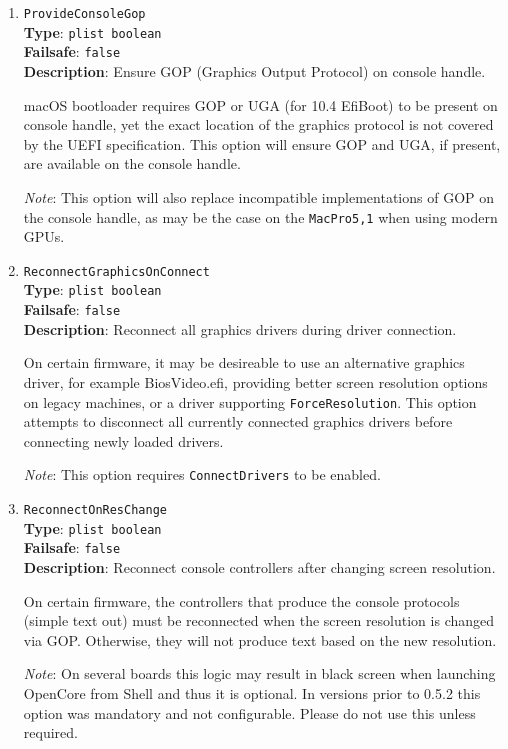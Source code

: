 \documentclass[]{article}
\begin{document}
\begin{enumerate}
\item
  \texttt{ProvideConsoleGop}\\
  \textbf{Type}: \texttt{plist\ boolean}\\
  \textbf{Failsafe}: \texttt{false}\\
  \textbf{Description}: Ensure GOP (Graphics Output Protocol) on console handle.

  macOS bootloader requires GOP or UGA (for 10.4 EfiBoot) to be present on console
  handle, yet the exact location of the graphics protocol is not covered by the
  UEFI specification. This option will ensure GOP and UGA, if present, are available
  on the console handle.

  \emph{Note}: This option will also replace incompatible implementations of GOP on the
  console handle, as may be the case on the \texttt{MacPro5,1} when using modern GPUs.

\item
  \texttt{ReconnectGraphicsOnConnect}\\
  \textbf{Type}: \texttt{plist\ boolean}\\
  \textbf{Failsafe}: \texttt{false}\\
  \textbf{Description}: Reconnect all graphics drivers during driver connection.

  On certain firmware, it may be desireable to use an alternative graphics driver,
  for example BiosVideo.efi, providing better screen resolution options on legacy
  machines, or a driver supporting \texttt{ForceResolution}. This option attempts
  to disconnect all currently connected graphics drivers before connecting newly
  loaded drivers.

  \emph{Note}: This option requires \texttt{ConnectDrivers} to be enabled.

\item
  \texttt{ReconnectOnResChange}\\
  \textbf{Type}: \texttt{plist\ boolean}\\
  \textbf{Failsafe}: \texttt{false}\\
  \textbf{Description}: Reconnect console controllers after changing screen resolution.

  On certain firmware, the controllers that produce the console protocols (simple text out)
  must be reconnected when the screen resolution is changed via GOP. Otherwise, they will
  not produce text based on the new resolution.

  \emph{Note}: On several boards this logic may result in black screen when launching
  OpenCore from Shell and thus it is optional. In versions prior to 0.5.2 this option
  was mandatory and not configurable. Please do not use this unless required.


\end{enumerate}
\end{document}
